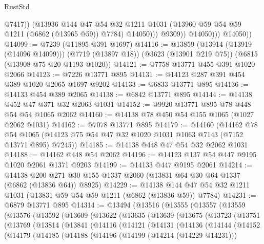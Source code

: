 \begin{lexlean}{RustStd}
\begin{coremodule}
                          @7417))
                      (@13936
                        @144
                        @47
                        @54
                        @32
                        @1211
                        @1031
                        (@13960 @59 @54 @59 @1211 (@6862 (@13965 @59)) @7784)
                        @14050)))
                  @9309))
              @14050)))
        @14050))
@14099 := @7239 (@11895 @391 @1697)
@14116 := @13859
    (@13914 (@13919 (@14096 @14099)))
    (@7719 (@13897 @18))
    (@3623 (@13901 @219 @75))
    (@6815 (@13908 @75 @20 @1193 @1020))
@14121 := @7758 @13771 @455 @391 @1020 @2066
@14123 := @7226 @13771 @895
@14131 := @14123 @287 @391 @454 @389 @1020 @2065 @1697 @9202
@14133 := @6833 @13771 @895
@14136 := @14133 @454 @389 @2065
@14138 := @6842 @13771 @895
@14144 := @14138 @452 @47 @371 @32 @2063 @1031
@14152 := @9920 @13771 @895 @78 @448 @54 @54 @1065 @2062
@14160 := @14138 @78 @450 @54 @155 @1065 (@1027 @2062 @1031)
@14162 := @7078 @13771 @895
@14179 := @14160
    (@14162
      @78
      @54
      @1065
      (@14123 @75 @54 @47 @32 @1020 @1031 @1063 @7143 (@7152 @13771 @895) @7245))
@14185 := @14138 @448 @47 @54 @32 @2062 @1031
@14188 := @14162 @448 @54 @2062
@14196 := @14123 @137 @54 @447 @9195 @1020 @2061 @1371 @9203
@14199 := @14133 @447 @9195 @2061
@14214 := @14138
    @200
    @271
    @30
    @155
    @1337
    @2060
    (@13831 @64 @30 @64 @1337 (@6862 (@13836 @64)) @8925)
@14229 := @14138 @144 @47 @54 @32 @1211 @1031 (@13831 @59 @54 @59 @1211 (@6862 (@13836 @59)) @7784)
@14231 := @6879 @13771 @895
@14314 := @13494
    (@13516
      (@13555
        (@13557
          (@13559
            (@13576
              (@13592
                (@13609
                  (@13622
                    (@13635
                      (@13639
                        (@13675
                          (@13723
                            (@13751
                              (@13769
                                (@13814
                                  (@13841
                                    (@14116
                                      (@14121
                                        (@14131
                                          (@14136
                                            (@14144
                                              (@14152
                                                (@14179
                                                  (@14185
                                                    (@14188
                                                      (@14196
                                                        (@14199 (@14214 (@14229 @14231)))

\end{coremodule}
\end{lexlean}
